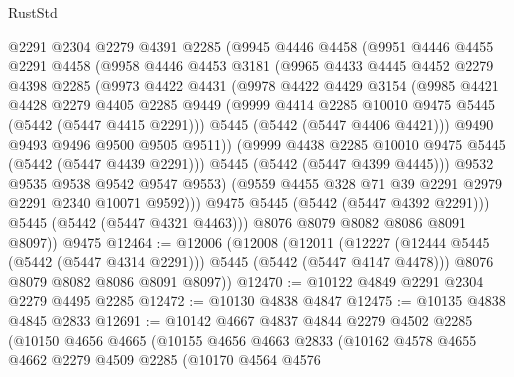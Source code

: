 \begin{lexlean}{RustStd}
\begin{coremodule}
            @2291
            @2304
            @2279
            @4391
            @2285
            (@9945
              @4446
              @4458
              (@9951
                @4446
                @4455
                @2291
                @4458
                (@9958
                  @4446
                  @4453
                  @3181
                  (@9965
                    @4433
                    @4445
                    @4452
                    @2279
                    @4398
                    @2285
                    (@9973
                      @4422
                      @4431
                      (@9978
                        @4422
                        @4429
                        @3154
                        (@9985
                          @4421
                          @4428
                          @2279
                          @4405
                          @2285
                          @9449
                          (@9999 @4414 @2285 @10010 @9475 @5445 (@5442 (@5447 @4415 @2291)))
                          @5445
                          (@5442 (@5447 @4406 @4421)))
                        @9490
                        @9493
                        @9496
                        @9500
                        @9505
                        @9511))
                    (@9999 @4438 @2285 @10010 @9475 @5445 (@5442 (@5447 @4439 @2291)))
                    @5445
                    (@5442 (@5447 @4399 @4445)))
                  @9532
                  @9535
                  @9538
                  @9542
                  @9547
                  @9553)
                (@9559 @4455 @328 @71 @39 @2291 @2979 @2291 @2340 @10071 @9592)))
            @9475
            @5445
            (@5442 (@5447 @4392 @2291)))
          @5445
          (@5442 (@5447 @4321 @4463)))
        @8076
        @8079
        @8082
        @8086
        @8091
        @8097))
    @9475
@12464 := @12006
    (@12008
      (@12011
        (@12227 (@12444 @5445 (@5442 (@5447 @4314 @2291))) @5445 (@5442 (@5447 @4147 @4478)))
        @8076
        @8079
        @8082
        @8086
        @8091
        @8097))
@12470 := @10122 @4849 @2291 @2304 @2279 @4495 @2285
@12472 := @10130 @4838 @4847
@12475 := @10135 @4838 @4845 @2833
@12691 := @10142
    @4667
    @4837
    @4844
    @2279
    @4502
    @2285
    (@10150
      @4656
      @4665
      (@10155
        @4656
        @4663
        @2833
        (@10162
          @4578
          @4655
          @4662
          @2279
          @4509
          @2285
          (@10170
            @4564
            @4576

\end{coremodule}
\end{lexlean}
